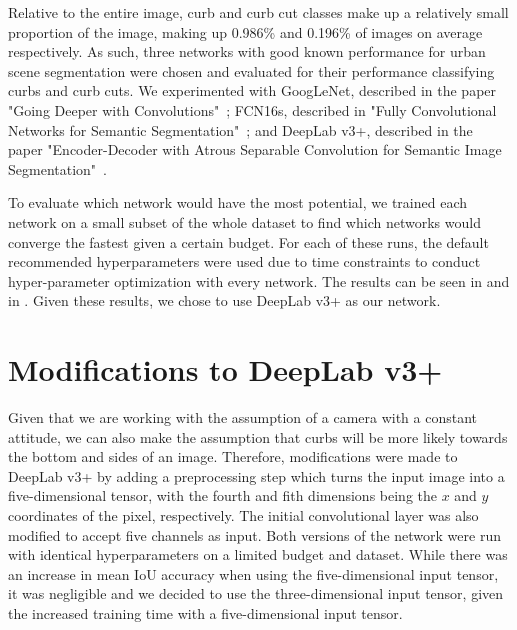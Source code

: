 Relative to the entire image, curb and curb cut classes make up a relatively small proportion of the image, making up 0.986\% and 0.196\% of images on average respectively.
As such, three networks with good known performance for urban scene segmentation were chosen and evaluated for their performance classifying curbs and curb cuts.
We experimented with GoogLeNet, described in the paper "Going Deeper with Convolutions"~\cite{googlenet}; FCN16s, described in "Fully Convolutional Networks for Semantic Segmentation"~\cite{fcn}; and DeepLab v3+, described in the paper "Encoder-Decoder with Atrous Separable Convolution for Semantic Image Segmentation"~\cite{deeplab}.

To evaluate which network would have the most potential, we trained each network on a small subset of the whole dataset to find which networks would converge the fastest given a certain budget.
For each of these runs, the default recommended hyperparameters were used due to time constraints to conduct hyper-parameter optimization with every network.
The results can be seen in  and in .
Given these results, we chose to use DeepLab v3+ as our network.




\section{Modifications to DeepLab v3+}\label{section:experiments-modifications}
Given that we are working with the assumption of a camera with a constant attitude, we can also make the assumption that curbs will be more likely towards the bottom and sides of an image.
Therefore, modifications were made to DeepLab v3+ by adding a preprocessing step which turns the input image into a five-dimensional tensor, with the fourth and fith dimensions being the $x$ and $y$ coordinates of the pixel, respectively.
The initial convolutional layer was also modified to accept five channels as input.
Both versions of the network were run with identical hyperparameters on a limited budget and dataset.
While there was an increase in mean IoU accuracy when using the five-dimensional input tensor, it was negligible and we decided to use the three-dimensional input tensor, given the increased training time with a five-dimensional input tensor.



